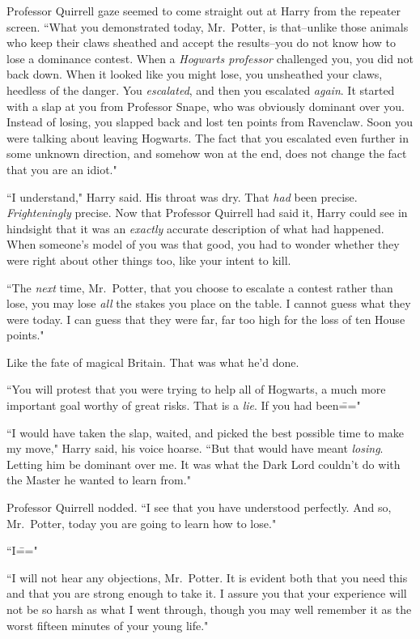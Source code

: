 Professor Quirrell gaze seemed to come straight out at Harry from the repeater screen. ``What you demonstrated today, Mr.~Potter, is that\---unlike those animals who keep their claws sheathed and accept the results\---you do not know how to lose a dominance contest. When a \emph{Hogwarts professor} challenged you, you did not back down. When it looked like you might lose, you unsheathed your claws, heedless of the danger. You \emph{escalated}, and then you escalated \emph{again}. It started with a slap at you from Professor Snape, who was obviously dominant over you. Instead of losing, you slapped back and lost ten points from Ravenclaw. Soon you were talking about leaving Hogwarts. The fact that you escalated even further in some unknown direction, and somehow won at the end, does not change the fact that you are an idiot."

``I understand," Harry said. His throat was dry. That \emph{had} been precise. \emph{Frighteningly} precise. Now that Professor Quirrell had said it, Harry could see in hindsight that it was an \emph{exactly} accurate description of what had happened. When someone's model of you was that good, you had to wonder whether they were right about other things too, like your intent to kill.

``The \emph{next} time, Mr.~Potter, that you choose to escalate a contest rather than lose, you may lose \emph{all} the stakes you place on the table. I cannot guess what they were today. I can guess that they were far, far too high for the loss of ten House points."

Like the fate of magical Britain. That was what he'd done.

``You will protest that you were trying to help all of Hogwarts, a much more important goal worthy of great risks. That is a \emph{lie}. If you had been\==="

``I would have taken the slap, waited, and picked the best possible time to make my move," Harry said, his voice hoarse. ``But that would have meant \emph{losing}. Letting him be dominant over me. It was what the Dark Lord couldn't do with the Master he wanted to learn from."

Professor Quirrell nodded. ``I see that you have understood perfectly. And so, Mr.~Potter, today you are going to learn how to lose."

``I\==="

``I will not hear any objections, Mr.~Potter. It is evident both that you need this and that you are strong enough to take it. I assure you that your experience will not be so harsh as what I went through, though you may well remember it as the worst fifteen minutes of your young life."

